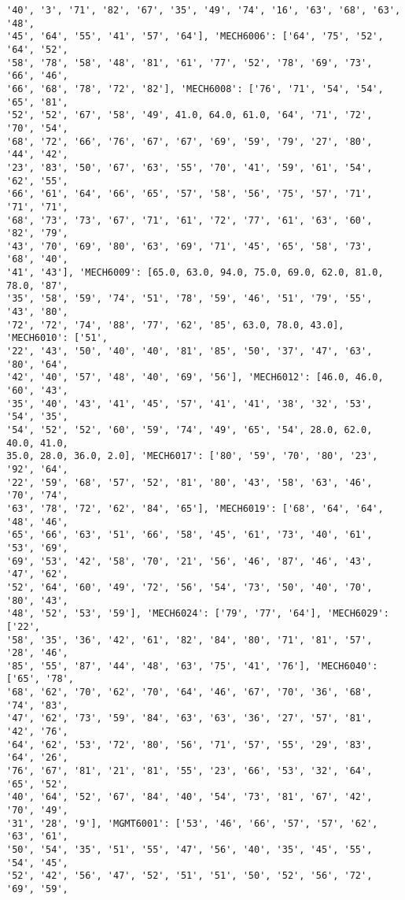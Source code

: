 \documentclass[11pt]{article}
\begin{document}
\begin{Verbatim}[commandchars=\\\{\}]
'40', '3', '71', '82', '67', '35', '49', '74', '16', '63', '68', '63', '48',
'45', '64', '55', '41', '57', '64'], 'MECH6006': ['64', '75', '52', '64', '52',
'58', '78', '58', '48', '81', '61', '77', '52', '78', '69', '73', '66', '46',
'66', '68', '78', '72', '82'], 'MECH6008': ['76', '71', '54', '54', '65', '81',
'52', '52', '67', '58', '49', 41.0, 64.0, 61.0, '64', '71', '72', '70', '54',
'68', '72', '66', '76', '67', '67', '69', '59', '79', '27', '80', '44', '42',
'23', '83', '50', '67', '63', '55', '70', '41', '59', '61', '54', '62', '55',
'66', '61', '64', '66', '65', '57', '58', '56', '75', '57', '71', '71', '71',
'68', '73', '73', '67', '71', '61', '72', '77', '61', '63', '60', '82', '79',
'43', '70', '69', '80', '63', '69', '71', '45', '65', '58', '73', '68', '40',
'41', '43'], 'MECH6009': [65.0, 63.0, 94.0, 75.0, 69.0, 62.0, 81.0, 78.0, '87',
'35', '58', '59', '74', '51', '78', '59', '46', '51', '79', '55', '43', '80',
'72', '72', '74', '88', '77', '62', '85', 63.0, 78.0, 43.0], 'MECH6010': ['51',
'22', '43', '50', '40', '40', '81', '85', '50', '37', '47', '63', '80', '64',
'42', '40', '57', '48', '40', '69', '56'], 'MECH6012': [46.0, 46.0, '60', '43',
'35', '40', '43', '41', '45', '57', '41', '41', '38', '32', '53', '54', '35',
'54', '52', '52', '60', '59', '74', '49', '65', '54', 28.0, 62.0, 40.0, 41.0,
35.0, 28.0, 36.0, 2.0], 'MECH6017': ['80', '59', '70', '80', '23', '92', '64',
'22', '59', '68', '57', '52', '81', '80', '43', '58', '63', '46', '70', '74',
'63', '78', '72', '62', '84', '65'], 'MECH6019': ['68', '64', '64', '48', '46',
'65', '66', '63', '51', '66', '58', '45', '61', '73', '40', '61', '53', '69',
'69', '53', '42', '58', '70', '21', '56', '46', '87', '46', '43', '47', '62',
'52', '64', '60', '49', '72', '56', '54', '73', '50', '40', '70', '80', '43',
'48', '52', '53', '59'], 'MECH6024': ['79', '77', '64'], 'MECH6029': ['22',
'58', '35', '36', '42', '61', '82', '84', '80', '71', '81', '57', '28', '46',
'85', '55', '87', '44', '48', '63', '75', '41', '76'], 'MECH6040': ['65', '78',
'68', '62', '70', '62', '70', '64', '46', '67', '70', '36', '68', '74', '83',
'47', '62', '73', '59', '84', '63', '63', '36', '27', '57', '81', '42', '76',
'64', '62', '53', '72', '80', '56', '71', '57', '55', '29', '83', '64', '26',
'76', '67', '81', '21', '81', '55', '23', '66', '53', '32', '64', '65', '52',
'40', '64', '52', '67', '84', '40', '54', '73', '81', '67', '42', '70', '49',
'31', '28', '9'], 'MGMT6001': ['53', '46', '66', '57', '57', '62', '63', '61',
'50', '54', '35', '51', '55', '47', '56', '40', '35', '45', '55', '54', '45',
'52', '42', '56', '47', '52', '51', '51', '50', '52', '56', '72', '69', '59',

\end{Verbatim}
\end{document}
